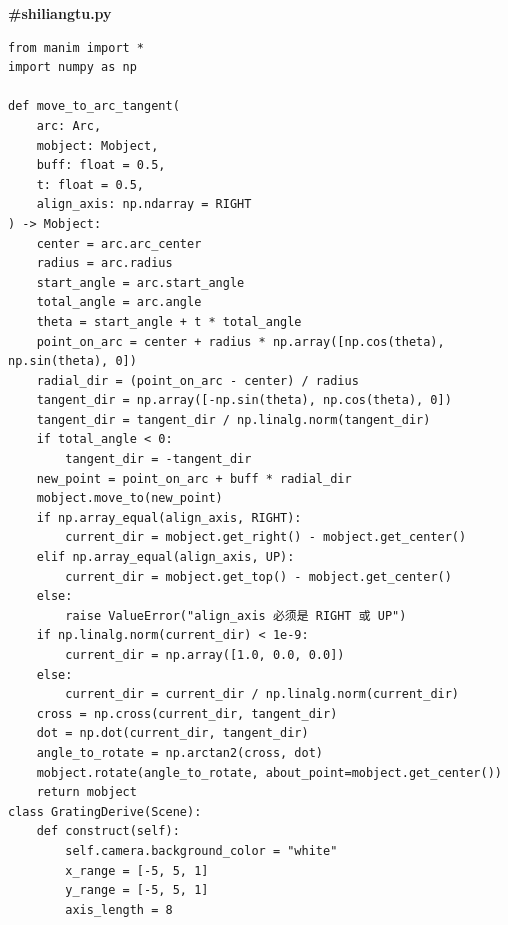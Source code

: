 \documentclass[12pt,a4paper]{ctexrep}
\begin{document}
\textbf{\#shiliangtu.py}

\begin{lstlisting}[style=pycode]
from manim import *
import numpy as np

def move_to_arc_tangent(
    arc: Arc,
    mobject: Mobject,
    buff: float = 0.5,
    t: float = 0.5,
    align_axis: np.ndarray = RIGHT
) -> Mobject:
    center = arc.arc_center
    radius = arc.radius
    start_angle = arc.start_angle
    total_angle = arc.angle
    theta = start_angle + t * total_angle
    point_on_arc = center + radius * np.array([np.cos(theta), np.sin(theta), 0])
    radial_dir = (point_on_arc - center) / radius
    tangent_dir = np.array([-np.sin(theta), np.cos(theta), 0])
    tangent_dir = tangent_dir / np.linalg.norm(tangent_dir)
    if total_angle < 0:
        tangent_dir = -tangent_dir
    new_point = point_on_arc + buff * radial_dir
    mobject.move_to(new_point)
    if np.array_equal(align_axis, RIGHT):
        current_dir = mobject.get_right() - mobject.get_center()
    elif np.array_equal(align_axis, UP):
        current_dir = mobject.get_top() - mobject.get_center()
    else:
        raise ValueError("align_axis 必须是 RIGHT 或 UP")
    if np.linalg.norm(current_dir) < 1e-9:
        current_dir = np.array([1.0, 0.0, 0.0])
    else:
        current_dir = current_dir / np.linalg.norm(current_dir)
    cross = np.cross(current_dir, tangent_dir)
    dot = np.dot(current_dir, tangent_dir)
    angle_to_rotate = np.arctan2(cross, dot)
    mobject.rotate(angle_to_rotate, about_point=mobject.get_center())
    return mobject
class GratingDerive(Scene):
    def construct(self):
        self.camera.background_color = "white"
        x_range = [-5, 5, 1]
        y_range = [-5, 5, 1]
        axis_length = 8


\end{lstlisting}
\end{document}
